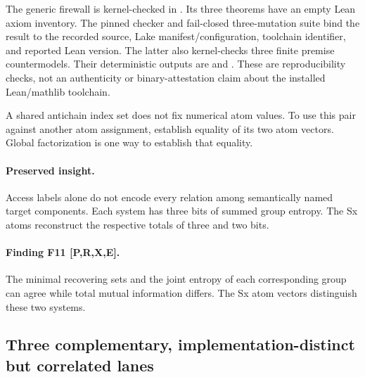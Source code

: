 \documentclass[11pt]{article}
\newcommand{\evidence}[1]{\textbf{[#1]}}
\begin{document}
The generic firewall is kernel-checked in
\newline
\mbox{}.
Its three theorems have an empty Lean axiom inventory.  The pinned checker
 and fail-closed
three-mutation suite
 bind the result
to the recorded source, Lake manifest/configuration, toolchain identifier, and
reported Lean version.  The latter also kernel-checks three finite premise
countermodels.  Their deterministic outputs are
{\small{}} and
{\small{}}.
These are reproducibility checks, not an authenticity or binary-attestation
claim about the installed Lean/mathlib toolchain.

A shared antichain index set does not fix numerical atom values.  To use
this pair against another atom assignment, establish equality of its two atom
vectors.  Global factorization is one way to establish that equality.

\paragraph{Preserved insight.}
Access labels alone do not encode every relation among semantically named
target components.  Each system has three bits of summed group entropy.
The Sx atoms reconstruct the respective totals of three and two bits.

\paragraph{Finding F11 \evidence{P,R,X,E}.}
The minimal recovering sets and the joint entropy of each corresponding group
can agree while total mutual information differs.  The Sx atom vectors
distinguish these two systems.

\subsection{Three complementary, implementation-distinct but correlated lanes}
\label{sec:found-witness-lanes}
\end{document}
